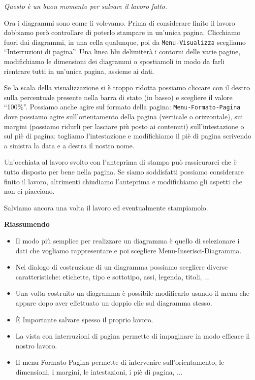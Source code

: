 \emph{Questo è un buon momento per salvare il lavoro fatto.}

Ora i diagrammi sono come li volevamo.
Prima di considerare finito il lavoro dobbiamo però controllare di poterlo
stampare in un'unica pagina.
Clicchiamo fuori dai diagrammi, in una cella qualunque,
poi da \texttt{Menu-Visualizza} scegliamo ``Interruzioni di pagina''.
Una linea blu delimiterà i contorni delle varie pagine, modifichiamo le
dimensioni dei diagrammi o spostiamoli in modo da farli rientrare tutti
in un'unica pagina, assieme ai dati.

Se la scala della visualizzazione si è troppo ridotta possiamo cliccare
con il destro sulla percentuale presente nella barra di stato (in basso)
e scegliere il valore ``100\%''. Possiamo anche agire sul formato della pagina:
\texttt{Menu-Formato-Pagina} dove possiamo agire sull'orientamento della pagina
(verticale o orizzontale), sui margini
(possiamo ridurli per lasciare più posto ai contenuti)
sull'intestazione o sul piè di pagina: togliamo l'intestazione e modifichiamo
il piè di pagina scrivendo a sinistra la data e a destra il nostro nome.

Un'occhiata al lavoro svolto con l'anteprima di stampa può rassicurarci che
è tutto disposto per bene nella pagina.
Se siamo soddisfatti possiamo considerare finito il lavoro, altrimenti
chiudiamo l'anteprima e modifichiamo gli aspetti che non ci piacciono.

Salviamo ancora una volta il lavoro ed eventualmente stampiamolo.

\textbf{Riassumendo}

\begin{itemize} [nosep]
\item Il modo più semplice per realizzare un diagramma è quello di selezionare
i dati che vogliamo rappresentare e poi scegliere Menu-Inserisci-Diagramma.
\item Nel dialogo di costruzione di un diagramma possiamo scegliere diverse
caratteristiche: etichette, tipo e sottotipo, assi, legenda, titoli, ...
\item Una volta costruito un diagramma è possibile modificarlo usando il menu
che appare dopo aver effettuato un doppio clic sul diagramma stesso.
\item È Importante salvare spesso il proprio lavoro.
\item La vista con interruzioni di pagina permette di impaginare in modo 
efficace il nostro lavoro.
\item Il menu-Formato-Pagina permette di intervenire sull'orientamento,
le dimensioni, i margini, le intestazioni, i piè di pagina, ...
\end{itemize}

